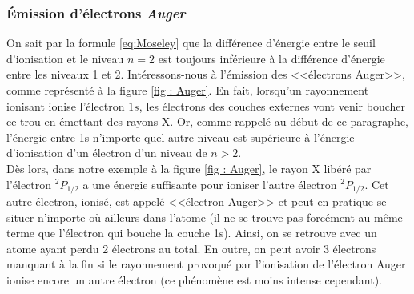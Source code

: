 \subsubsection{Émission d'électrons \emph{Auger}}



On sait par la formule \ref{eq:Moseley} que la différence d'énergie entre le seuil d'ionisation et le niveau $n = 2$ est toujours inférieure à la différence d'énergie entre les niveaux 1 et 2. Intéressons-nous à l'émission des <<électrons Auger>>, comme représenté à la figure \ref{fig : Auger}. En fait, lorsqu'un rayonnement ionisant ionise l'électron $1s$, les électrons des couches externes vont venir boucher ce trou en émettant des rayons X. Or, comme rappelé au début de ce paragraphe, l'énergie entre 1s n'importe quel autre niveau est supérieure à l'énergie d'ionisation d'un électron d'un niveau de $n>2$.\\

Dès lors, dans notre exemple à la figure \ref{fig : Auger}, le rayon X libéré par l'électron $^2P_{1/2}$ a une énergie suffisante pour ioniser l'autre électron $^2P_{1/2}$. Cet autre électron, ionisé, est appelé <<électron Auger>> et peut en pratique se situer n'importe où ailleurs dans l'atome (il ne se trouve pas forcément au même terme que l'électron qui bouche la couche 1s). Ainsi, on se retrouve avec un atome ayant perdu 2 électrons au total. En outre, on peut avoir 3 électrons manquant à la fin si le rayonnement provoqué par l'ionisation de l'électron Auger ionise encore un autre électron (ce phénomène est moins intense cependant).\\

